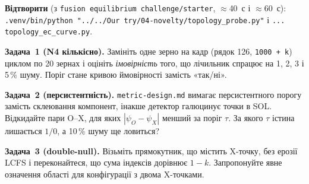 \begin{practicum}
\textbf{Відтворити} (з \texttt{fusion equilibrium challenge/starter}, $\approx$40~с і $\approx$60~с): \texttt{.venv/bin/python "../../Our try/04-novelty/topology\_probe.py"} і \texttt{... topology\_ec\_curve.py}.

\textbf{Задача~1 (N4 кількісно).} Замініть одне зерно на кадр (рядок 126, \texttt{1000 + k}) циклом по 20 зернах і оцініть \emph{імовірність} того, що лічильник спрацює на 1, 2, 3 і 5\,\% шуму. Поріг стане кривою ймовірності замість «так/ні».

\textbf{Задача~2 (персистентність).} \texttt{metric-design.md} вимагає персистентного порогу замість склеювання компонент, інакше детектор галюцинує точки в SOL. Відкидайте пари O--X, для яких $|\psi_O-\psi_X|$ менший за поріг $\tau$. За якого $\tau$ істина лишається $1/0$, а 10\,\% шуму ще ловиться?

\textbf{Задача~3 (double-null).} Візьміть прямокутник, що містить X-точку, без ерозії LCFS і переконайтеся, що сума індексів дорівнює $1-k$. Запропонуйте явне означення області для конфігурації з двома X-точками.
\end{practicum}
